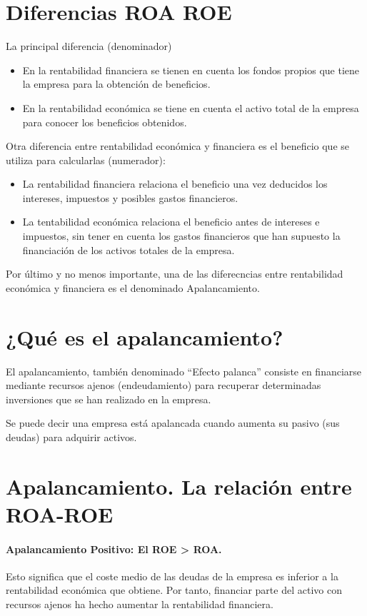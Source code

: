 \section{Diferencias ROA ROE}
La principal diferencia (denominador)
\begin{itemize}
    \item En la rentabilidad financiera se tienen en cuenta los fondos propios que tiene la empresa para la obtención de beneficios.
    \item En la rentabilidad económica se tiene en cuenta el activo total de la empresa para conocer los beneficios obtenidos.
\end{itemize}

Otra diferencia entre rentabilidad económica y financiera es el beneficio que se utiliza para calcularlas (numerador):
\begin{itemize}
    \item La rentabilidad financiera relaciona el beneficio una vez deducidos los intereses, impuestos y posibles gastos financieros.
    \item La tentabilidad económica relaciona el beneficio antes de intereses e impuestos, sin tener en cuenta los gastos financieros que han supuesto la financiación de los activos totales de la empresa.
\end{itemize}

Por último y no menos importante, una de las diferecncias entre rentabilidad económica y financiera es el denominado Apalancamiento.

\section{¿Qué es el apalancamiento?}
El apalancamiento, también denominado ``Efecto palanca'' consiste en financiarse mediante recursos ajenos (endeudamiento) para recuperar determinadas inversiones que se han realizado en la empresa.

Se puede decir una empresa está apalancada cuando aumenta su pasivo (sus deudas) para adquirir activos.

\section{Apalancamiento. La relación entre ROA-ROE}
\paragraph{Apalancamiento Positivo: El ROE > ROA.} Esto significa que el coste medio de las deudas de la empresa es inferior a la rentabilidad económica que obtiene. Por tanto, financiar parte del activo con recursos ajenos ha hecho aumentar la rentabilidad financiera.

